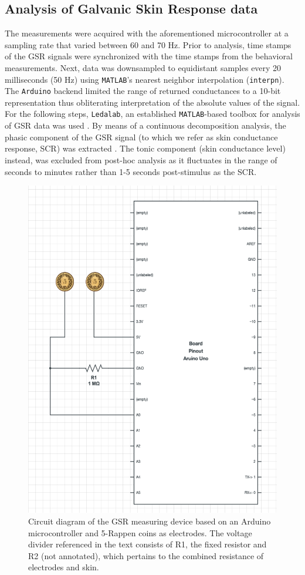 \documentclass{article}
\begin{document}
\begin{multicols}{2}
\subsection*{Analysis of Galvanic Skin Response data}
The measurements were acquired with the aforementioned microcontroller at a sampling rate that varied between 60 and 70 Hz. Prior to analysis, time stamps of the GSR signals were synchronized with the time stamps from the behavioral measurements. Next, data was downsampled to equidistant samples every 20 milliseconds (50 Hz) using \texttt{MATLAB}'s nearest neighbor interpolation (\texttt{interpn}). The \texttt{Arduino} backend limited the range of returned conductances to a 10-bit representation thus obliterating interpretation of the absolute values of the signal. For the following steps, \texttt{Ledalab}, an established \texttt{MATLAB}-based toolbox for analysis of GSR data was used \citep{karenbach2005ledalab}. By means of a continuous decomposition analysis, the phasic component of the GSR signal (to which we refer as skin conductance response, SCR) was extracted \citep{benedek2010continuous}. The tonic component (skin conductance level) instead, was excluded from post-hoc analysis as it fluctuates in the range of seconds to minutes rather than 1-5 seconds post-stimulus as the SCR. \\
\begin{figure}[H]
\centering
\includegraphics[width=.48\textwidth]{arduino.png}
  \caption{Circuit diagram of  the GSR measuring device based on an Arduino microcontroller and 5-Rappen coins as electrodes. The voltage divider referenced in the text consists of R1, the fixed resistor and R2 (not annotated), which pertains to the combined resistance of electrodes and skin.}
  \label{fig:gsr-setup}
\end{figure}%



\end{multicols}
\end{document}
